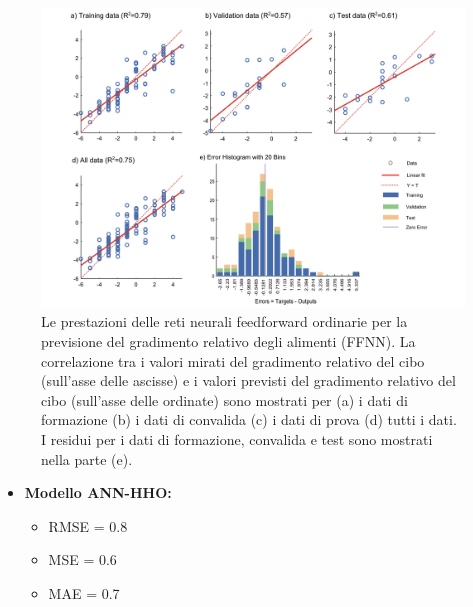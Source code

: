 \begin{figure}[H]
      \captionsetup{font=scriptsize}
      \centering
      \includegraphics[width=1\textwidth]{Chapters/Figures/ffnn-result.png} 
      \caption{\small Le prestazioni delle reti neurali feedforward ordinarie per la previsione del gradimento relativo degli alimenti (FFNN). La correlazione tra i valori mirati del gradimento relativo del cibo (sull'asse delle ascisse) e i valori previsti del gradimento relativo del cibo (sull'asse delle ordinate) sono mostrati per (a) i dati di formazione (b) i dati di convalida (c) i dati di prova (d) tutti i dati. I residui per i dati di formazione, convalida e test sono mostrati nella parte (e). \cite{alamir2021enhanced}}
      \label{fig:ffnn-abc}
\end{figure}

\newpage
\begin{itemize}
       \item \textbf{Modello ANN-HHO:}
            \begin{itemize}
                  \item RMSE = 0.8
                  \item MSE = 0.6
                  \item MAE = 0.7
            \end{itemize}
\end{itemize}

